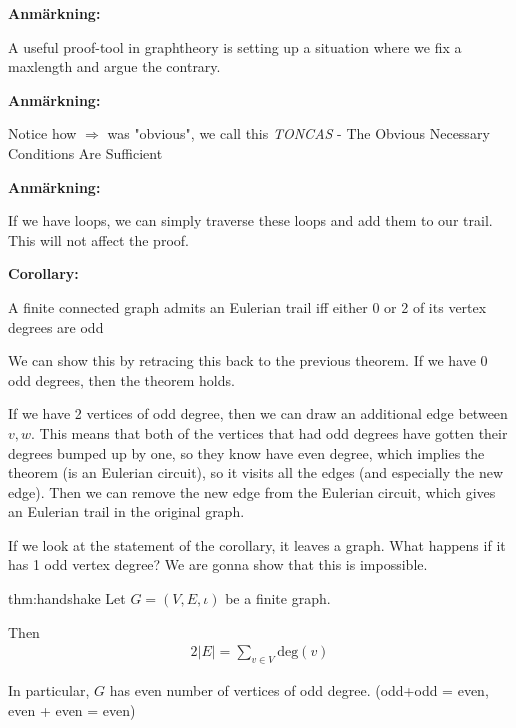 \par\bigskip
\noindent\textbf{Anmärkning:}\par
\noindent A useful proof-tool in graphtheory is setting up a situation where we fix a maxlength and argue the contrary.
\par\bigskip
\noindent\textbf{Anmärkning:}\par
\noindent Notice how $\Rightarrow$ was "obvious", we call this \textit{TONCAS} - The Obvious Necessary Conditions Are Sufficient
\par\bigskip
\noindent\textbf{Anmärkning:}\par
\noindent If we have loops, we can simply traverse these loops and add them to our trail. This will not affect the proof.
\par\bigskip
\noindent\textbf{Corollary:}\par
\noindent A finite connected graph admits an Eulerian trail iff either 0 or 2 of its vertex degrees are odd
\par\bigskip
\noindent We can show this by retracing this back to the previous theorem. If we have 0 odd degrees, then the theorem holds.\par
\noindent If we have 2 vertices of odd degree, then we can draw an additional edge between $v,w$. This means that both of the vertices that had odd degrees have gotten their degrees bumped up by one, so they know have even degree, which implies the theorem (is an Eulerian circuit), so it visits all the edges (and especially the new edge). Then we can remove the new edge from the Eulerian circuit, which gives an Eulerian trail in the original graph.
\par\bigskip
\noindent If we look at the statement of the corollary, it leaves a graph. What happens if it has 1 odd vertex degree? We are gonna show that this is impossible.
\newpage
\begin{theo}{thm:handshake}
  Let $G = (V,E,\iota)$ be a finite graph.\par
  \noindent Then
  \begin{equation*}
    \begin{gathered}
      2\left|E\right| = \sum_{v\in V}\text{deg}(v)
    \end{gathered}
  \end{equation*}
  \par\bigskip
  \noindent In particular, $G$ has even number of vertices of odd degree. (odd+odd = even, even + even = even)
\end{theo}
\par\bigskip
